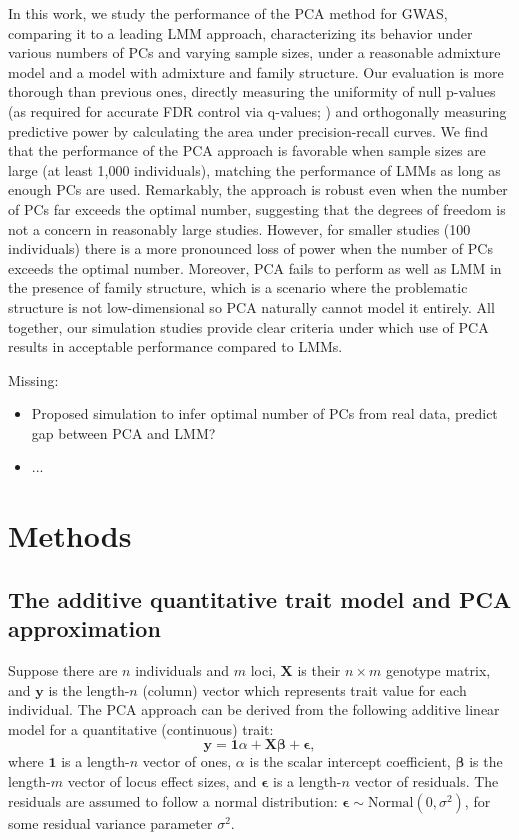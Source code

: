 \documentclass[12pt]{article}
\begin{document}
In this work, we study the performance of the PCA method for GWAS, comparing it to a leading LMM approach, characterizing its behavior under various numbers of PCs and varying sample sizes, under a reasonable admixture model and a model with admixture and family structure.
Our evaluation is more thorough than previous ones, directly measuring the uniformity of null p-values (as required for accurate FDR control via q-values; \cite{storey_positive_2003, storey_statistical_2003}) and orthogonally measuring predictive power by calculating the area under precision-recall curves.
We find that the performance of the PCA approach is favorable when sample sizes are large (at least 1,000 individuals), matching the performance of LMMs as long as enough PCs are used.
Remarkably, the approach is robust even when the number of PCs far exceeds the optimal number, suggesting that the degrees of freedom is not a concern in reasonably large studies.
However, for smaller studies (100 individuals) there is a more pronounced loss of power when the number of PCs exceeds the optimal number.
Moreover, PCA fails to perform as well as LMM in the presence of family structure, which is a scenario where the problematic structure is not low-dimensional so PCA naturally cannot model it entirely.
All together, our simulation studies provide clear criteria under which use of PCA results in acceptable performance compared to LMMs.

Missing:
\begin{itemize}
\item Proposed simulation to infer optimal number of PCs from real data, predict gap between PCA and LMM?
\item ...
\end{itemize}

\section{Methods}

\subsection{The additive quantitative trait model and PCA approximation}

Suppose there are $n$ individuals and $m$ loci,
$\mathbf{X}$ is their $n \times m$ genotype matrix, and
$\mathbf{y}$ is the length-$n$ (column) vector which represents trait value for each individual.
The PCA approach can be derived from the following additive linear model for a quantitative (continuous) trait:
$$
\mathbf{y}
=
\mathbf{1} \alpha + \mathbf{X} \mathbf{\beta} + \mathbf{\epsilon}
,
$$
where
$\mathbf{1}$ is a length-$n$ vector of ones,
$\alpha$ is the scalar intercept coefficient,
$\mathbf{\beta}$ is the length-$m$ vector of locus effect sizes, and
$\mathbf{\epsilon}$ is a length-$n$ vector of residuals.
The residuals are assumed to follow a normal distribution: $\mathbf{\epsilon} \sim \text{Normal}(0, \sigma^2)$, for some residual variance parameter $\sigma^2$.
\end{document}

